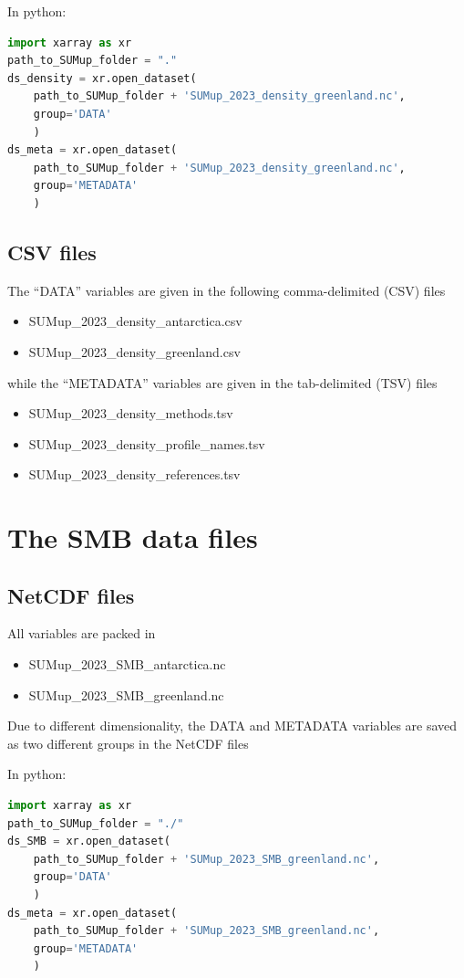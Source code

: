 \documentclass[journal abbreviation, manuscript]{copernicus}
\begin{document}
In python:
\begin{lstlisting}[language=python]
import xarray as xr
path_to_SUMup_folder = "."
ds_density = xr.open_dataset(
    path_to_SUMup_folder + 'SUMup_2023_density_greenland.nc', 
    group='DATA'
    )
ds_meta = xr.open_dataset(
    path_to_SUMup_folder + 'SUMup_2023_density_greenland.nc',
    group='METADATA'
    )
\end{lstlisting} 


\subsection{CSV files}
The “DATA” variables are given in the following comma-delimited (CSV) files 
\begin{itemize}
\item SUMup\_2023\_density\_antarctica.csv 
\item SUMup\_2023\_density\_greenland.csv 
\end{itemize}

while the “METADATA” variables are given in the tab-delimited (TSV) files
\begin{itemize}
\item SUMup\_2023\_density\_methods.tsv
\item SUMup\_2023\_density\_profile\_names.tsv
\item SUMup\_2023\_density\_references.tsv
\end{itemize}



\section{The SMB data files}
\subsection{NetCDF files}

All variables are packed in 

\begin{itemize}
\item SUMup\_2023\_SMB\_antarctica.nc
\item SUMup\_2023\_SMB\_greenland.nc
\end{itemize}
Due to different dimensionality, the DATA and METADATA variables are saved as two different groups in the NetCDF files

In python:
\begin{lstlisting}[language=python]
import xarray as xr
path_to_SUMup_folder = "./"
ds_SMB = xr.open_dataset(
    path_to_SUMup_folder + 'SUMup_2023_SMB_greenland.nc', 
    group='DATA'
    )
ds_meta = xr.open_dataset(
    path_to_SUMup_folder + 'SUMup_2023_SMB_greenland.nc',
    group='METADATA'
    )
\end{lstlisting} 
\end{document}
